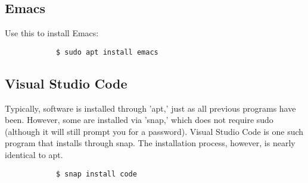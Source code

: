 \documentclass{liu_mall_engelska}
\begin{document}
    \subsection{Emacs}
        Use this to install Emacs:
        \begin{lstlisting} 
            $ sudo apt install emacs
        \end{lstlisting}
    
    \subsection{Visual Studio Code}
        Typically, software is installed through 'apt,' just as all previous programs have been. However, some are installed via 'snap,' which does not require sudo (although it will still prompt you for a password). Visual Studio Code is one such program that installs through snap. The installation process, however, is nearly identical to apt.
        \begin{lstlisting}
            $ snap install code
        \end{lstlisting}
    
\end{document}
